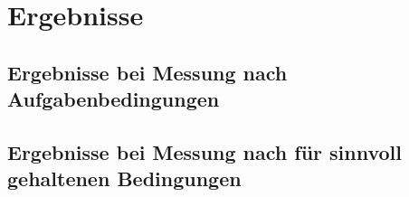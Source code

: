 \chapter{Ergebnisse}
\section{Ergebnisse bei Messung nach Aufgabenbedingungen}
\section{Ergebnisse bei Messung nach für sinnvoll gehaltenen Bedingungen}